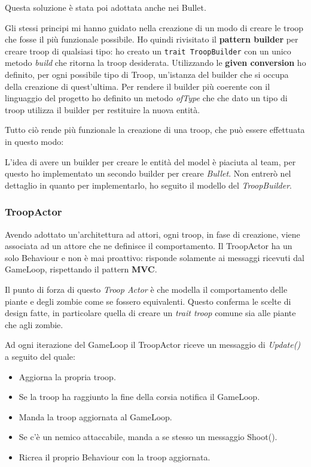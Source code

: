 

Questa soluzione è stata poi adottata anche nei Bullet.

Gli stessi principi mi hanno guidato nella creazione di un modo di creare le troop che fosse il più funzionale possibile.
Ho quindi rivisitato il \textbf{pattern builder} per creare troop di qualsiasi tipo: ho creato un \texttt{trait TroopBuilder}
con un unico metodo \textit{build} che ritorna la troop desiderata.
Utilizzando le \textbf{given conversion} ho definito, per ogni possibile tipo di Troop, un'istanza del builder che si occupa
della creazione di quest'ultima.
Per rendere il builder più coerente con il linguaggio del progetto ho definito un metodo \textit{ofType} che che dato un tipo
di troop utilizza il builder per restituire la nuova entità.



Tutto ciò rende più funzionale la creazione di una troop, che può essere effettuata in questo modo:



L'idea di avere un builder per creare le entità del model è piaciuta al team, per questo ho implementato un secondo builder per creare \textit{Bullet}.
Non entrerò nel dettaglio in quanto per implementarlo, ho seguito il modello del \textit{TroopBuilder}.

\subsubsection{TroopActor}
Avendo adottato un'architettura ad attori, ogni troop, in fase di creazione, viene associata ad un attore che ne definisce il comportamento.
Il TroopActor ha un solo Behaviour e non è mai proattivo: risponde solamente ai messaggi ricevuti dal GameLoop, rispettando il pattern \textbf{MVC}.

Il punto di forza di questo \textit{Troop Actor} è che modella il comportamento delle piante e degli zombie come se fossero equivalenti.
Questo conferma le scelte di design fatte, in particolare quella di creare un \textit{trait troop} comune sia alle piante che agli zombie.

Ad ogni iterazione del GameLoop il TroopActor riceve un messaggio di \textit{Update()} a seguito del quale:
\begin{itemize}
    \item Aggiorna la propria troop.
    \item Se la troop ha raggiunto la fine della corsia notifica il GameLoop.
    \item Manda la troop aggiornata al GameLoop.
    \item Se c'è un nemico attaccabile, manda a se stesso un messaggio Shoot().
    \item Ricrea il proprio Behaviour con la troop aggiornata.
\end{itemize}

